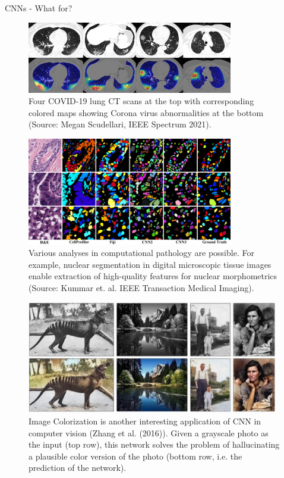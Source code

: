 \begin{vbframe}{CNNs - What for?}
   \begin{figure}
    \centering
    \includegraphics[width=9cm]{figure/hitmap.jpeg}
    \caption{Four COVID-19 lung CT scans at the top with corresponding colored maps showing Corona virus abnormalities at the bottom (Source: Megan Scudellari, IEEE Spectrum 2021).}
  \end{figure}
\framebreak

  \begin{figure}
    \centering
    \includegraphics[width=9cm]{figure/instanceseg.png}
    \caption{Various analyses in computational pathology are possible. For example, nuclear segmentation in digital microscopic tissue images enable extraction of high-quality features for nuclear morphometrics (Source: Kummar et. al. IEEE Transaction Medical Imaging). }
  \end{figure}
\framebreak

  \begin{figure}
    \centering
    \includegraphics[width=11cm]{figure/colorization.png}
    \caption{Image Colorization is another interesting application of CNN in computer vision (Zhang et al. (2016)). Given a grayscale photo as the input (top row), this network solves the problem of hallucinating a plausible color version of the photo (bottom row, i.e. the prediction of the network).}
  \end{figure}
\framebreak


\end{vbframe}
